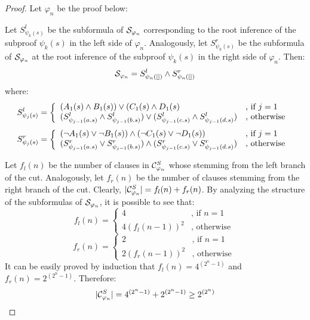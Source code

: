 \begin{proof}
\noindent
Let $\varphi_n$ be the proof below:
\begin{small}
\begin{prooftree}
		 
\end{prooftree}
\end{small}

\noindent
Let $S_{\psi_k(s)}^l$ be the subformula of $\struct{\varphi_n}$ corresponding to the root inference of the subproof $\psi_k(s)$ in the left side of $\varphi_n$. Analogously, let $S_{\psi_k(s)}^r$ be the subformula of $\struct{\varphi_n}$ at the root inference of the subproof $\psi_k(s)$ in the right side of $\varphi_n$. Then:
$$
\struct{\varphi_n} = S_{\psi_n([])}^l \structplus S_{\psi_n([])}^r
$$
%
where:
$$
S_{\psi_j(s)}^l = \left\{ \begin{array}{ll}
(A_1(s) \structplus B_1(s)) \structtimes (C_1(s) \structplus D_1(s) & \textrm{, if } j=1 \\
(S_{\psi_{j-1}(a.s)}^l \structplus S_{\psi_{j-1}(b.s)}^l) \structtimes (S_{\psi_{j-1}(c.s)}^l \structplus S_{\psi_{j-1}(d.s)}^l) & \textrm{, otherwise }
\end{array}\right.
$$
$$
S_{\psi_j(s)}^r = \left\{ \begin{array}{ll}
  (\neg A_1(s) \structtimes \neg B_1(s)) 
  \structplus
  (\neg C_1(s) \structtimes \neg D_1(s))  & \textrm{, if } j=1 \\
  (S_{\psi_{j-1}(a.s)}^r \structtimes S_{\psi_{j-1}(b.s)}^r) 
  \structplus
  (S_{\psi_{j-1}(c.s)}^r \structtimes S_{\psi_{j-1}(d.s)}^r) & \textrm{, otherwise }
\end{array}\right.
$$

\noindent
Let $f_l(n)$ be the number of clauses in $\clausesetStandard{\varphi_n}$ whose stemming from the left branch of the cut. Analogously, let $f_r(n)$ be the number of clauses stemming from the right branch of the cut. Clearly, $|\clausesetStandard{\varphi_n}| = f_l(n) + f_r(n)$. By analyzing the structure of the subformulas of $\struct{\varphi_n}$, it is possible to see that:
$$
f_l(n) = \left\{ \begin{array}{ll}
4 & \textrm{, if } n=1 \\
4 (f_l(n-1))^2 & \textrm{, otherwise }
\end{array}\right.
$$
$$
f_r(n) = \left\{ \begin{array}{ll}
2 & \textrm{, if } n=1 \\
2 (f_r(n-1))^2 & \textrm{, otherwise }
\end{array}\right.
$$
%
It can be easily proved by induction that $f_l(n) = 4^{(2^n - 1)}$ and $f_r(n) = 2^{(2^n - 1)}$. Therefore:
$$
|\clausesetStandard{\varphi_n}| = 4^{(2^n - 1)} + 2^{(2^n - 1)} \geq 2^{(2^n)} 
$$
\hfill\QED
\end{proof}



